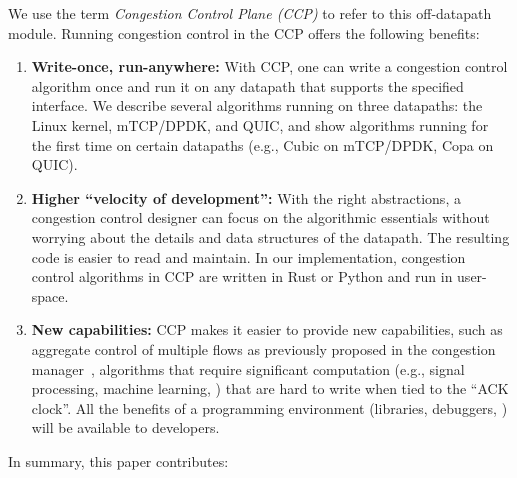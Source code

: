We use the term {\em Congestion Control Plane (CCP)} to refer to this off-datapath module. Running congestion control in the CCP offers the following benefits:
\begin{enumerate}
    \item {\bf Write-once, run-anywhere:} With CCP, one can write a congestion control algorithm once and run it on any datapath that supports the specified interface. 
    We describe several algorithms running on three datapaths: the Linux kernel, mTCP/DPDK, and QUIC, and show algorithms running for the first time on certain datapaths (e.g., Cubic on mTCP/DPDK, Copa on QUIC).
    \item {\bf Higher ``velocity of development'':} With the right abstractions,
      a congestion control designer can focus on the algorithmic essentials
      without worrying about the details and data structures of the
      datapath. The resulting code is easier to read and maintain. In our implementation, congestion control algorithms in CCP are written in Rust or Python and run in user-space. 

    \item {\bf New capabilities:} CCP makes it easier to provide new
      capabilities, such as aggregate control of multiple flows as previously
      proposed in the congestion manager~\cite{cm}, algorithms that require significant computation (e.g., signal processing, machine learning, \etc) that are hard to write when tied to the ``ACK clock''.
    All the benefits of a \userspace
      programming environment (libraries, debuggers, \etc) will be available to
      developers.
\end{enumerate}

\vspace{0.1in}
In summary, this paper contributes:

